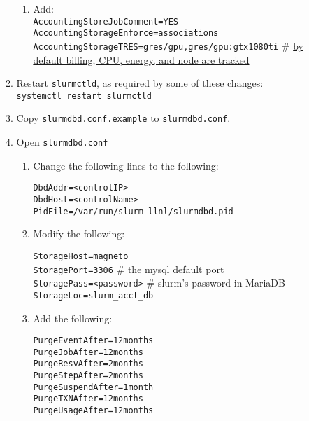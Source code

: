 \begin{enumerate}
\begin{enumerate}
\begin{enumerate}
          \item Add: \\
          \texttt{AccountingStoreJobComment=YES} \\
          \texttt{AccountingStorageEnforce=associations} \\
          \texttt{AccountingStorageTRES=gres/gpu,gres/gpu:gtx1080ti}	\quad \# \href{https://slurm.schedmd.com/tres.html}{by default billing, CPU, energy, and node are tracked}
      \end{enumerate}
	
    \item Restart \texttt{slurmctld}, as required by some of these changes: \\ %
    \texttt{systemctl restart slurmctld}

    \item Copy \texttt{slurmdbd.conf.example} to \texttt{slurmdbd.conf}.

    \item Open \texttt{slurmdbd.conf} 

      \begin{enumerate}
        \item Change the following lines to the following:

          \texttt{DbdAddr=<controlIP>} \\
          \texttt{DbdHost=<controlName>} \\
          \texttt{PidFile=/var/run/slurm-llnl/slurmdbd.pid}  %
	
        \item Modify the following:

          \texttt{StorageHost=magneto} \\
          \texttt{StoragePort=3306}  \quad \# the mysql default port \\
          \texttt{StoragePass=<password>}		\quad \# slurm's password in MariaDB
          \texttt{StorageLoc=slurm\_acct\_db}
	
        \item Add the following:

          \texttt{PurgeEventAfter=12months} \\
          \texttt{PurgeJobAfter=12months} \\
          \texttt{PurgeResvAfter=2months} \\
          \texttt{PurgeStepAfter=2months} \\
          \texttt{PurgeSuspendAfter=1month} \\
          \texttt{PurgeTXNAfter=12months} \\
          \texttt{PurgeUsageAfter=12months}
      \end{enumerate}


\end{enumerate}
\end{enumerate}
